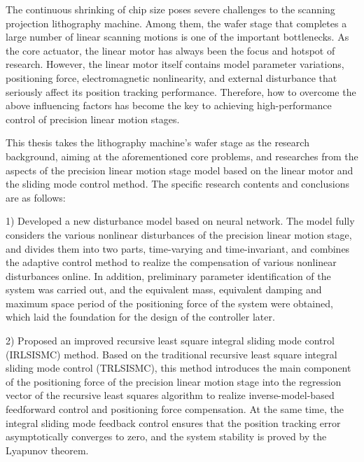 \documentclass[type=master, oneside]{fduthesis}
\begin{document}
\begin{abstract*}
 The continuous shrinking of chip size poses severe challenges to the scanning projection lithography machine. Among them, the wafer stage that completes a large number of linear scanning motions is one of the important bottlenecks. As the core actuator, the linear motor has always been the focus and hotspot of research. However, the linear motor itself contains model parameter variations, positioning force, electromagnetic nonlinearity, and external disturbance that seriously affect its position tracking performance. Therefore, how to overcome the above influencing factors has become the key to achieving high-performance control of precision linear motion stages.
 
 This thesis takes the lithography machine's wafer stage as the research background, aiming at the aforementioned core problems, and researches from the aspects of the precision linear motion stage model based on the linear motor and the sliding mode control method. The specific research contents and conclusions are as follows:
 
 1) Developed a new disturbance model based on neural network. The model fully considers the various nonlinear disturbances of the precision linear motion stage, and divides them into two parts, time-varying and time-invariant, and combines the adaptive control method to realize the compensation of various nonlinear disturbances online. In addition, preliminary parameter identification of the system was carried out, and the equivalent mass, equivalent damping and maximum space period of the positioning force of the system were obtained, which laid the foundation for the design of the controller later.
 
 2) Proposed an improved recursive least square integral sliding mode control (IRLSISMC) method. Based on the traditional recursive least square integral sliding mode control (TRLSISMC), this method introduces the main component of the positioning force of the precision linear motion stage into the regression vector of the recursive least squares algorithm to realize inverse-model-based feedforward control and positioning force compensation. At the same time, the integral sliding mode feedback control ensures that the position tracking error asymptotically converges to zero, and the system stability is proved by the Lyapunov theorem.
 

\end{abstract*}
\end{document}
